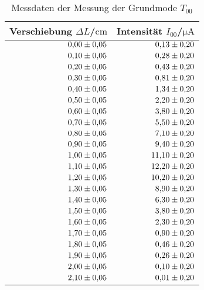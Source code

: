 \begin{table}
 \caption{Messdaten der Messung der Grundmode $T_{00}$}
 \label{tab:t00}
 \centering
{} \begin{tabular}{rr}
 \toprule 
    {Verschiebung $\Delta L$/$\si{\centi\meter}$}& {Intensität $I_{\mathrm{00}}$/$\si{\micro\ampere}$} \\
     \midrule
     $\num{0.00 \pm 0.05}$ & $\num{0.13\pm0.20}$ \\
     $\num{0.10 \pm 0.05}$ & $\num{0.28\pm0.20}$ \\
     $\num{0.20 \pm 0.05}$ & $\num{0.43\pm0.20}$ \\
     $\num{0.30 \pm 0.05}$ & $\num{0.81\pm0.20}$ \\
     $\num{0.40 \pm 0.05}$ & $\num{1.34\pm0.20}$ \\
     $\num{0.50 \pm 0.05}$ & $\num{2.20\pm0.20}$ \\
     $\num{0.60 \pm 0.05}$ & $\num{3.80\pm0.20}$ \\
     $\num{0.70 \pm 0.05}$ & $\num{5.50\pm0.20}$ \\
     $\num{0.80 \pm 0.05}$ & $\num{7.10\pm0.20}$ \\
     $\num{0.90 \pm 0.05}$ & $\num{9.40\pm0.20}$ \\
     $\num{1.00 \pm 0.05}$ & $\num{11.10\pm0.20}$ \\
     $\num{1.10 \pm 0.05}$ & $\num{12.20\pm0.20}$ \\
     $\num{1.20 \pm 0.05}$ & $\num{10.20\pm0.20}$ \\
     $\num{1.30 \pm 0.05}$ & $\num{8.90\pm0.20}$ \\
     $\num{1.40 \pm 0.05}$ & $\num{6.30\pm0.20}$ \\
     $\num{1.50 \pm 0.05}$ & $\num{3.80\pm0.20}$ \\
     $\num{1.60 \pm 0.05}$ & $\num{2.30\pm0.20}$ \\
     $\num{1.70 \pm 0.05}$ & $\num{0.90\pm0.20}$ \\
     $\num{1.80 \pm 0.05}$ & $\num{0.46\pm0.20}$ \\
     $\num{1.90 \pm 0.05}$ & $\num{0.26\pm0.20}$ \\
     $\num{2.00 \pm 0.05}$ & $\num{0.10\pm0.20}$ \\
     $\num{2.10 \pm 0.05}$ & $\num{0.01\pm0.20}$ \\
 \bottomrule
 \end{tabular}
\end{table}